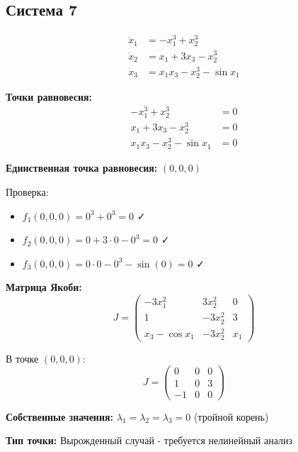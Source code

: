 \subsection*{Система 7}

\begin{align}
\dot{x}_1 &= -x_1^3 + x_2^3 \\
\dot{x}_2 &= x_1 + 3x_3 - x_2^3 \\
\dot{x}_3 &= x_1 x_3 - x_2^3 - \sin x_1
\end{align}

\textbf{Точки равновесия:}
\begin{align}
-x_1^3 + x_2^3 &= 0 \\
x_1 + 3x_3 - x_2^3 &= 0 \\
x_1 x_3 - x_2^3 - \sin x_1 &= 0
\end{align}

\textbf{Единственная точка равновесия:} $(0, 0, 0)$

Проверка:
\begin{itemize}
\item $f_1(0,0,0) = 0^3 + 0^3 = 0$ ✓
\item $f_2(0,0,0) = 0 + 3 \cdot 0 - 0^3 = 0$ ✓
\item $f_3(0,0,0) = 0 \cdot 0 - 0^3 - \sin(0) = 0$ ✓
\end{itemize}

\textbf{Матрица Якоби:}
$$J = \begin{pmatrix} 
-3x_1^2 & 3x_2^2 & 0 \\
1 & -3x_2^2 & 3 \\
x_3 - \cos x_1 & -3x_2^2 & x_1
\end{pmatrix}$$

В точке $(0, 0, 0)$:
$$J = \begin{pmatrix} 
0 & 0 & 0 \\
1 & 0 & 3 \\
-1 & 0 & 0
\end{pmatrix}$$

\textbf{Собственные значения:} $\lambda_1 = \lambda_2 = \lambda_3 = 0$ (тройной корень)

\textbf{Тип точки:} Вырожденный случай - требуется нелинейный анализ
